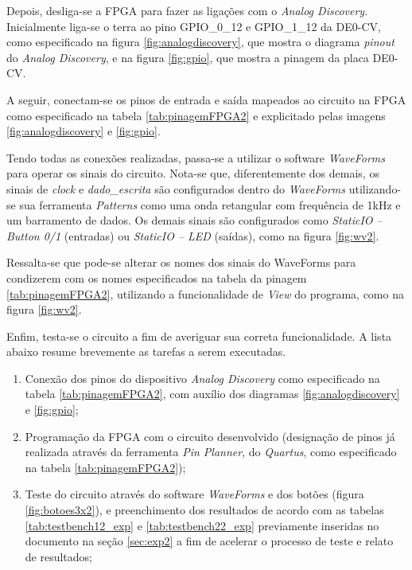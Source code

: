 \documentclass[amsmath,amssymb,floatfix]{report}
\begin{document}
Depois, desliga-se a FPGA para fazer as ligações com o \textit{Analog Discovery}. Inicialmente liga-se o terra ao pino GPIO\_0\_12 e GPIO\_1\_12 da DE0-CV, como especificado na figura \ref{fig:analogdiscovery}, que mostra o diagrama \textit{pinout} do \textit{Analog Discovery}, e na figura \ref{fig:gpio}, que mostra a pinagem da placa DE0-CV.

A seguir, conectam-se os pinos de entrada e saída mapeados ao circuito na FPGA como especificado na tabela \ref{tab:pinagemFPGA2} e explicitado pelas imagens \ref{fig:analogdiscovery} e \ref{fig:gpio}.

Tendo todas as conexões realizadas, passa-se a utilizar o software \textit{WaveForms} para operar os sinais do circuito. Nota-se que, diferentemente dos demais, os sinais de \textit{clock} e \textit{dado\_escrita} são configurados dentro do \textit{WaveForms} utilizando-se sua ferramenta \textit{Patterns} como uma onda retangular com frequência de 1kHz e um barramento de dados. Os demais sinais são configurados como \textit{StaticIO -- Button 0/1} (entradas) ou \textit{StaticIO -- LED} (saídas), como na figura \ref{fig:wv2}.

Ressalta-se que pode-se alterar os nomes dos sinais do WaveForms para condizerem com os nomes especificados na tabela da pinagem \ref{tab:pinagemFPGA2}, utilizando a funcionalidade de \textit{View} do programa, como na figura \ref{fig:wv2}.

Enfim, testa-se o circuito a fim de averiguar sua correta funcionalidade. A lista abaixo resume brevemente as tarefas a serem executadas.

\begin{enumerate}
    \item Conexão dos pinos do dispositivo \textit{Analog Discovery} como especificado na tabela \ref{tab:pinagemFPGA2}, com auxílio dos diagramas \ref{fig:analogdiscovery} e \ref{fig:gpio};
    \item Programação da FPGA com o circuito desenvolvido (designação de pinos já realizada através da ferramenta \textit{Pin Planner}, do \textit{Quartus}, como especificado na tabela \ref{tab:pinagemFPGA2});
    \item Teste do circuito através do software \textit{WaveForms} e dos botões (figura \ref{fig:botoes3x2}), e preenchimento dos resultados de acordo com as tabelas \ref{tab:testbench12_exp} e \ref{tab:testbench22_exp} previamente inseridas no documento na seção \ref{sec:exp2} a fim de acelerar o processo de teste e relato de resultados;
\end{enumerate}
\end{document}
